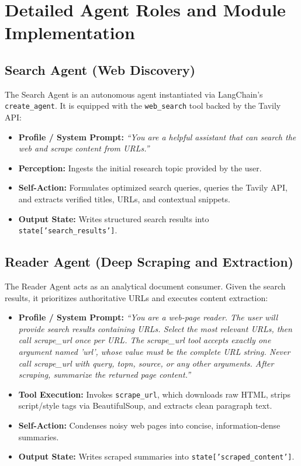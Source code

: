 \documentclass[12pt,a4paper]{report}
\begin{document}
\section{Detailed Agent Roles and Module Implementation}

\subsection{Search Agent (Web Discovery)}
The Search Agent is an autonomous agent instantiated via LangChain's \texttt{create\_agent}. It is equipped with the \texttt{web\_search} tool backed by the Tavily API:
\begin{itemize}
    \item \textbf{Profile / System Prompt:} \textit{``You are a helpful assistant that can search the web and scrape content from URLs.''}
    \item \textbf{Perception:} Ingests the initial research topic provided by the user.
    \item \textbf{Self-Action:} Formulates optimized search queries, queries the Tavily API, and extracts verified titles, URLs, and contextual snippets.
    \item \textbf{Output State:} Writes structured search results into \texttt{state['search\_results']}.
\end{itemize}

\subsection{Reader Agent (Deep Scraping and Extraction)}
The Reader Agent acts as an analytical document consumer. Given the search results, it prioritizes authoritative URLs and executes content extraction:
\begin{itemize}
    \item \textbf{Profile / System Prompt:} \textit{``You are a web-page reader. The user will provide search results containing URLs. Select the most relevant URLs, then call scrape\_url once per URL. The scrape\_url tool accepts exactly one argument named 'url', whose value must be the complete URL string. Never call scrape\_url with query, topn, source, or any other arguments. After scraping, summarize the returned page content.''}
    \item \textbf{Tool Execution:} Invokes \texttt{scrape\_url}, which downloads raw HTML, strips script/style tags via BeautifulSoup, and extracts clean paragraph text.
    \item \textbf{Self-Action:} Condenses noisy web pages into concise, information-dense summaries.
    \item \textbf{Output State:} Writes scraped summaries into \texttt{state['scraped\_content']}.
\end{itemize}
\end{document}
